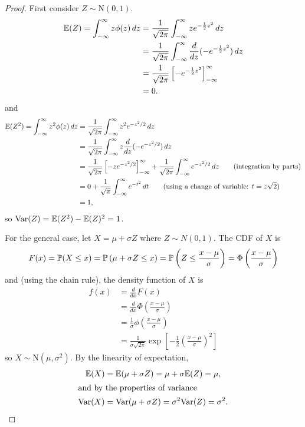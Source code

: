 \begin{proof}
First consider $Z\sim\text{N}(0,1)$.
\begin{align*}
\mathbb{E}(Z) = \int_{-\infty}^{\infty} z \phi(z) \,dz 
	& = \frac{1}{\sqrt{2\pi}}\int_{-\infty}^{\infty} z e^{-\frac{1}{2}z^2} \,dz \\
	& = \frac{1}{\sqrt{2\pi}}\int_{-\infty}^{\infty} \frac{d}{dz}(-e^{-\frac{1}{2}z^2}) \,dz \\
	& = \frac{1}{\sqrt{2\pi}}\left[ -e^{-\frac{1}{2}z^2} \right]_{-\infty}^{\infty} \\
	& = 0. 
\end{align*}
and
\begin{align*}
\mathbb{E}(Z^2) 
	= \int_{-\infty}^{\infty} z^2 \phi(z)\,dz 
	& = \frac{1}{\sqrt{2\pi}}\int_{-\infty}^{\infty} z^2 e^{-z^2/2} \,dz \\
	& = \frac{1}{\sqrt{2\pi}}\int_{-\infty}^{\infty} z\frac{d}{dz}(-e^{-z^2/2}) \,dz \\
	& = \frac{1}{\sqrt{2\pi}}\left[ -ze^{-z^2/2} \right]_{-\infty}^{\infty} + \frac{1}{\sqrt{2\pi}}\int_{-\infty}^{\infty} e^{-z^2/2}\,dz \qquad\text{(integration by parts)}\\
	& = 0 + \frac{1}{\sqrt{\pi}}\int_{-\infty}^{\infty} e^{-t^2}\,dt \qquad\text{(using a change of variable: $t=z\sqrt{2}$)} \\
	& = 1,
\end{align*}	
so $\text{Var}(Z) = \mathbb{E}(Z^2) - \mathbb{E}(Z)^2 = 1$.

\vspace*{2ex}
For the general case, let $X=\mu+\sigma Z$ where $Z\sim N(0,1)$. The CDF of $X$ is 
\[
F(x) 
	= \mathbb{P}(X\leq x) 
	= \mathbb{P}\left(\mu + \sigma Z \leq x\right) 
	= \mathbb{P}\left(Z\leq \frac{x-\mu}{\sigma}\right) 
	= \Phi\left(\frac{x-\mu}{\sigma}\right)
\]
and (using the chain rule), the density function of $X$ is
\begin{align*}
f(x) 
	& = \frac{d}{dx}F(x) \\
	& = \frac{d}{dx}\Phi\left(\frac{x-\mu}{\sigma}\right) \\
	& = \frac{1}{\sigma}\phi\left(\frac{x-\mu}{\sigma}\right) \\
	& = \frac{1}{\sigma\sqrt{2\pi}}\exp\left[{-\displaystyle\frac{1}{2}\left(\frac{x-\mu}{\sigma}\right)^2}\right]
\end{align*}
so $X\sim\text{N}(\mu,\sigma^2)$. By the linearity of expectation, 
\begin{align*}
\mathbb{E}(X)	& = \mathbb{E}(\mu+\sigma Z) = \mu + \sigma\mathbb{E}(Z) = \mu, \\
\intertext{and by the properties of variance}
\text{Var}(X)	& = \text{Var}(\mu+\sigma Z) = \sigma^2\text{Var}(Z) = \sigma^2.
\end{align*}
\end{proof}


